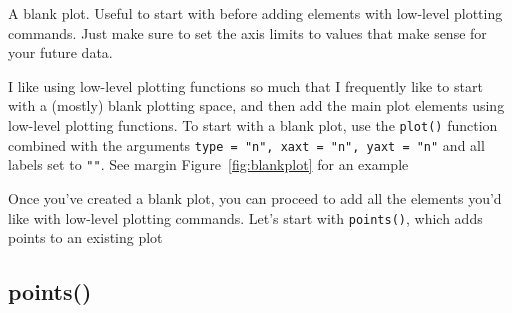 \documentclass{tufte-book}\usepackage[]{graphicx}\usepackage[]{color}
\makeatletter
\newcommand{\hlnum}[1]{\textcolor[rgb]{0.686,0.059,0.569}{#1}}%
\newcommand{\hlstr}[1]{\textcolor[rgb]{0.192,0.494,0.8}{#1}}%
\newcommand{\hlcom}[1]{\textcolor[rgb]{0.678,0.584,0.686}{\textit{#1}}}%
\newcommand{\hlopt}[1]{\textcolor[rgb]{0,0,0}{#1}}%
\newcommand{\hlstd}[1]{\textcolor[rgb]{0.345,0.345,0.345}{#1}}%
\newcommand{\hlkwb}[1]{\textcolor[rgb]{0.69,0.353,0.396}{#1}}%
\newcommand{\hlkwc}[1]{\textcolor[rgb]{0.333,0.667,0.333}{#1}}%
\newcommand{\hlkwd}[1]{\textcolor[rgb]{0.737,0.353,0.396}{\textbf{#1}}}%
\newenvironment{kframe}{%
 \def\at@end@of@kframe{}%
 \ifinner\ifhmode%
  \def\at@end@of@kframe{\end{minipage}}%
  \begin{minipage}{\columnwidth}%
 \fi\fi%
 \def\FrameCommand##1{\hskip\@totalleftmargin \hskip-\fboxsep
 \colorbox{shadecolor}{##1}\hskip-\fboxsep
     \hskip-\linewidth \hskip-\@totalleftmargin \hskip\columnwidth}%
 \MakeFramed {\advance\hsize-\width
   \@totalleftmargin\z@ \linewidth\hsize
   \@setminipage}}%
 {\par\unskip\endMakeFramed%
 \at@end@of@kframe}
\newenvironment{knitrout}{}{} %
\makeatother
\begin{document}
\begin{footnotesize}
\begin{marginfigure}
\begin{tiny}
\begin{knitrout}
\end{knitrout}
\end{tiny}
\caption{A blank plot. Useful to start with before adding elements with low-level plotting commands. Just make sure to set the axis limits to values that make sense for your future data.}
\label{fig:blankplot}
\end{marginfigure}

I like using low-level plotting functions so much that I frequently like to start with a (mostly) blank plotting space, and then add the main plot elements using low-level plotting functions. To start with a blank plot, use the \texttt{plot()} function combined with the arguments \texttt{type = "n", xaxt = "n", yaxt = "n"} and all labels set to \texttt{""}. See margin Figure~\ref{fig:blankplot} for an example

Once you've created a blank plot, you can proceed to add all the elements you'd like with low-level plotting commands. Let's start with \texttt{points()}, which adds points to an existing plot

\subsection{points()}


\begin{marginfigure}
\end{marginfigure}
\end{footnotesize}
\end{document}
